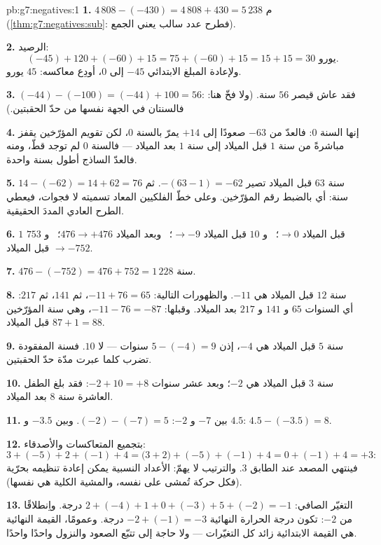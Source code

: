 \begin{solution}{pb:g7:negatives:1}
\textbf{1.} $4\,808 - (-430) = 4\,808 + 430 = 5\,238$ م
(\cref{thm:g7:negatives:sub}: فطرح عدد سالب يعني
الجمع).

\textbf{2.} الرصيد:
\[
(-45) + 120 + (-60) + 15 = 75 + (-60) + 15 = 15 + 15 = 30
\text{ يورو}.
\]
ولإعادة المبلغ الابتدائي $-45$ إلى $0$، أودِع معاكسه:
$45$ يورو.

\textbf{3.} $(-44) - (-100) = (-44) + 100 = 56$: فقد عاش قيصر
$56$ سنة. (ولا فخّ هنا: فالسنتان في الجهة نفسها من
حدّ الحقبتين.)

\textbf{4.} إنها السنة $0$: فالعدّ من $-63$ صعودًا إلى $+14$ يمرّ
بالسنة $0$، لكن تقويم المؤرّخين يقفز مباشرةً من
سنة $1$ قبل الميلاد إلى سنة $1$ بعد الميلاد --- فالسنة $0$ لم توجد قطّ، ومنه فالعدّ
الساذج أطول بسنة واحدة.

\textbf{5.} سنة $63$ قبل الميلاد تصير $-(63 - 1) = -62$. ثم
$14 - (-62) = 14 + 62 = 76$ سنة: أي بالضبط رقم
المؤرّخين. وعلى خطّ الفلكيين المعاد تسميته لا فجوات،
فيعطي الطرح العادي المددَ الحقيقية.

\textbf{6.} $1$ قبل الميلاد $\to 0$؛ \ و $10$ قبل الميلاد $\to -9$؛ \ وبعد الميلاد
$476 \to +476$؛ \ و $753$ قبل الميلاد $\to -752$.

\textbf{7.} $476 - (-752) = 476 + 752 = 1\,228$ سنة.

\textbf{8.} سنة $12$ قبل الميلاد هي $-11$. والظهورات التالية:
$-11 + 76 = 65$، ثم $141$، ثم $217$: أي السنوات $65$ و
$141$ و $217$ بعد الميلاد. وقبلها: $-11 - 76 = -87$، وهي
سنة المؤرّخين $87 + 1 = 88$ قبل الميلاد.

\textbf{9.} سنة $5$ قبل الميلاد هي $-4$، إذن $5 - (-4) = 9$ سنوات --- لا
$10$. فسنة  المفقودة تضرب كلما عبرت مدّة
حدّ الحقبتين.

\textbf{10.} سنة $3$ قبل الميلاد هي $-2$؛ وبعد عشر سنوات $-2 + 10 = +8$:
فقد بلغ الطفل العاشرة سنة $8$ بعد الميلاد.

\textbf{11.} بين $-7$ و $-2$: $(-2) - (-7) = 5$. وبين
$-3.5$ و $4.5$: $4.5 - (-3.5) = 8$.

\textbf{12.} بتجميع المتعاكسات والأصدقاء:
\[
3 + (-5) + 2 + (-1) + 4
= \bigl(3 + 2\bigr) + (-5) + (-1) + 4
= 0 + (-1) + 4 = +3 :
\]
فينتهي المصعد عند الطابق $3$. والترتيب لا يهمّ: 
الأعداد النسبية يمكن إعادة تنظيمه بحرّية (فكل حركة تُمشى
على  نفسه، والمشية الكلية هي نفسها).

\textbf{13.} التغيّر الصافي:
$2 + (-4) + 1 + 0 + (-3) + 5 + (-2) = -1$ درجة. واِنطلاقًا من
$-2$: تكون درجة الحرارة النهائية $-2 + (-1) = -3$ درجة. وعمومًا،
القيمة النهائية هي القيمة الابتدائية زائد  كل
التغيّرات --- ولا حاجة إلى تتبّع الصعود والنزول واحدًا واحدًا.


\end{solution}
